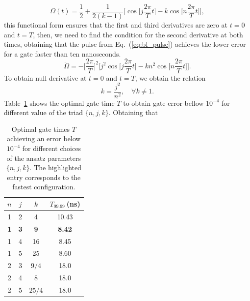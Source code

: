\documentclass[superscriptaddress,amsmath,amssymb,aps,twocolumn,praplied,notitlepage]{revtex4-2}
\begin{document}
\begin{equation}
    \Omega(t) = \frac{1}{2} +\frac{1}{2(k-1)}\bigg[\cos\bigg[j \frac{2\pi}{T}t\bigg]-k\cos\bigg[n \frac{2\pi}{T}t\bigg]\bigg],
\end{equation}
this functional form ensures that the first and third derivatives are zero at $t=0$ and $t=T$, then, we need to find the condition for the second derivative at both times, obtaining that the pulse from Eq.~(\ref{eq:bl_pulse}) achieves the lower error for a gate faster than ten nanoseconds.
\begin{equation}
    \ddot{\Omega}=-\bigg[\frac{2\pi}{T}\bigg]^2\bigg[j^2\cos\bigg[j \frac{2\pi}{T}t\bigg] -kn^2\cos\bigg[n \frac{2\pi}{T}t\bigg]\bigg].
\end{equation}
To obtain null derivative at $t=0$ and $t=T$, we obtain the relation
\begin{equation}
    k = \frac{j^2}{n^2},\quad \forall k\neq 1.
\end{equation}
Table~\ref{tab:my_label} shows the optimal gate time $T$ to obtain gate error bellow $10^{-4}$ for different value of the triad $\{n,j,k\}$. Obtaining that 
\begin{table}[b!]
    \centering
    \setlength{\tabcolsep}{10pt}
    \renewcommand{\arraystretch}{1.2}
    \begin{tabular}{|c|c|c|c|}
        \hline
        $n$ & $j$ & $k$ & $T_{99.99}~$(ns) \\
        \hline
        1 & 2 & 4 & 10.43 \\\hline
        \rowcolor{green!20}
        \textbf{1} & \textbf{3} & \textbf{9} & \textbf{\cellcolor{green!40}8.42} \\
        \hline
        1 & 4 & 16 & 8.45 \\\hline
        1 & 5 & 25 & 8.60 \\\hline
        2 & 3 & $9/4$ & 18.0 \\\hline
        2 & 4 & 8 & 18.0 \\\hline
        2 & 5 & $25/4$ & 18.0 \\
        \hline
    \end{tabular}
    \caption{Optimal gate times $T$ achieving an error below $10^{-4}$ for different choices of the ansatz parameters $\{n, j, k\}$. The highlighted entry corresponds to the fastest configuration.}
    \label{tab:my_label}
\end{table}




\end{document}
